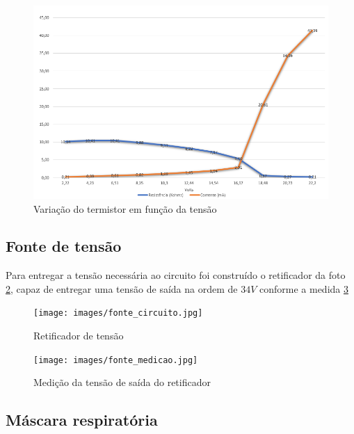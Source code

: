 \begin{figure}[h!]
	\begin{center}
		\includegraphics[width=0.9\linewidth]{images/variacao_resistencia_termistor.png}
		\caption{Variação do termistor em função da tensão}
		\label{fig:variacao_termistor}
	\end{center}
\end{figure}
\FloatBarrier

\subsection{Fonte de tensão}

Para entregar a tensão necessária ao circuito foi construído o retificador da foto \ref{fig:fonte_circuito}, capaz de entregar uma tensão de saída na ordem de $34V$ conforme a medida \ref{fig:fonte_medicao}

\begin{figure}[h!]
	\begin{center}
		\texttt{[image: images/fonte\_circuito.jpg]}
		\caption{Retificador de tensão}
		\label{fig:fonte_circuito}
	\end{center}
\end{figure}

\begin{figure}[h!]
	\begin{center}
		\texttt{[image: images/fonte\_medicao.jpg]}
		\caption{Medição da tensão de saída do retificador}
		\label{fig:fonte_medicao}
	\end{center}
\end{figure}
\FloatBarrier

\subsection{Máscara respiratória}


